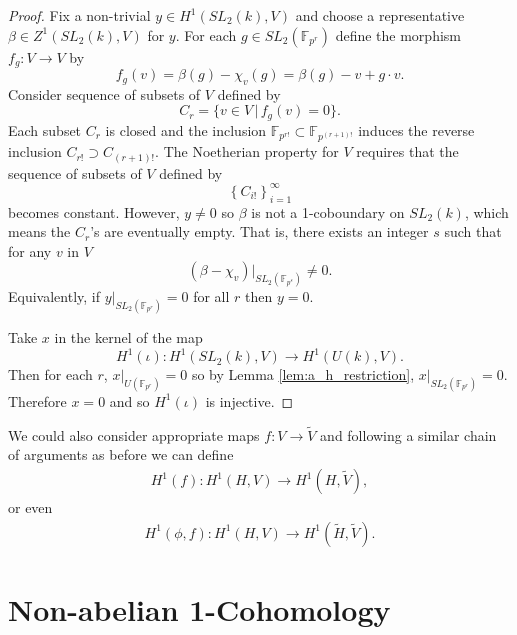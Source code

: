\begin{proof}
	Fix a non-trivial $y\in H^1(SL_2(k), V)$ and choose a representative $\beta\in Z^1(SL_2(k), V)$ for $y$. For each $g\in SL_2(\mathbb{F}_{p^r})$ define the morphism $f_g:V\rightarrow V$ by
	\begin{displaymath}
		f_g(v) = \beta(g) - \chi_v(g) = \beta(g) - v + g\cdot v.
	\end{displaymath}
	Consider sequence of subsets of $V$ defined by
	\begin{displaymath}
		C_r = \{v \in V \,|\, f_g(v) = 0\}.
	\end{displaymath}
	Each subset $C_r$ is closed and the inclusion $\mathbb{F}_{p^{r!}} \subset \mathbb{F}_{p^{(r+1)!}}$ induces the reverse inclusion $C_{r!} \supset C_{(r+1)!}$. The Noetherian property for $V$ requires that the sequence of subsets of $V$ defined by
	\begin{displaymath}
		\left\{C_{i!}\right\}_{i = 1}^\infty
	\end{displaymath}
	becomes constant. However, $y\neq 0$ so $\beta$ is not a 1-coboundary on $SL_2(k)$, which means the $C_r$'s are eventually empty. That is, there exists an integer $s$ such that for any $v$ in $V$
	\begin{displaymath}
		(\beta - \chi_v)|_{SL_2(\mathbb{F}_{p^s})} \neq 0.
	\end{displaymath}
	Equivalently, if $y|_{SL_2(\mathbb{F}_{p^r})} = 0$ for all $r$ then $y = 0$.
	
	Take $x$ in the kernel of the map 
	\begin{displaymath}
	 H^1(\iota) : H^1(SL_2(k), V) \rightarrow H^1(U(k), V).
       \end{displaymath}
	Then for each $r$, $x|_{U(\mathbb{F}_{p^r})} = 0$ so by Lemma \ref{lem:a_h_restriction}, $x|_{SL_2(\mathbb{F}_{p^r})} = 0$. Therefore $x=0$ and so $H^1(\iota)$ is injective.
\end{proof}

We could also consider appropriate maps $f:V\rightarrow\tilde{V}$ and following a similar chain of arguments as before we can define
\begin{eqnarray*}
	H^1(f):H^1(H, V)\rightarrow H^1(H, \tilde{V}),
\end{eqnarray*}
or even	
\begin{eqnarray*}
	H^1(\phi, f):H^1(H, V)\rightarrow H^1(\tilde{H}, \tilde{V}).
\end{eqnarray*}

\section{Non-abelian 1-Cohomology}
	
